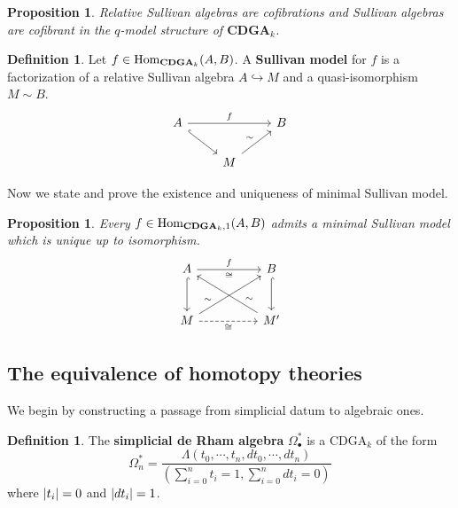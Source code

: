\documentclass[psamsfonts]{amsart}
\newtheorem{prop}[thm]{Proposition}
\theoremstyle{definition}
\newtheorem{defn}[thm]{Definition}
\theoremstyle{remark}
\newcommand{\Hom}{\textup{Hom}}
\newcommand{\CDGA}{\mathbf{CDGA}}
\numberwithin{equation}{section}
\begin{document}
\begin{prop}
Relative Sullivan algebras are cofibrations and Sullivan algebras are cofibrant in the $q$-model structure of $\CDGA_k$.
\end{prop}

\begin{defn}
Let $f\in\Hom_{\CDGA_k}(A,B)$. A \textbf{Sullivan model} for $f$ is a factorization of a relative Sullivan algebra $A\hookrightarrow M$ and a quasi-isomorphism $M\sim B$.
\[\begin{tikzcd}
A\arrow[dr,hookrightarrow]\arrow[rr,"f"]&&B\\
&M\arrow[ur,"\sim"]
\end{tikzcd}\]
\end{defn}

Now we state and prove the existence and uniqueness of minimal Sullivan model.

\begin{prop}
Every $f\in\Hom_{\CDGA_k,1}(A,B)$ admits a minimal Sullivan model which is unique up to isomorphism.
\[\begin{tikzcd}[row sep=large]
	A && B \\
	M && {M'}
	\arrow["f","\cong"', from=1-1, to=1-3]
	\arrow["\sim" near start, from=2-1, to=1-3]
	\arrow["\sim"' near start, from=2-3, to=1-1]
	\arrow["\cong"',dashed, from=2-1, to=2-3]
	\arrow[from=1-1,hookrightarrow, to=2-1]
	\arrow[from=1-3,hookrightarrow, to=2-3]
\end{tikzcd}\]
\end{prop}

\subsection{The equivalence of homotopy theories} 

We begin by constructing a passage from simplicial datum to algebraic ones.

\begin{defn}
The \textbf{simplicial de Rham algebra} $\Omega_\bullet^\ast$ is a CDGA$_k$ of the form
\[\Omega_n^\ast=\frac{\Lambda(t_0,\cdots,t_n,dt_0,\cdots,dt_n)}{\left(\sum_{i=0}^nt_i=1,\sum_{i=0}^ndt_i=0\right)}\]
where $\abs{t_i}=0$ and $\abs{dt_i}=1$.
\end{defn}
\end{document}
